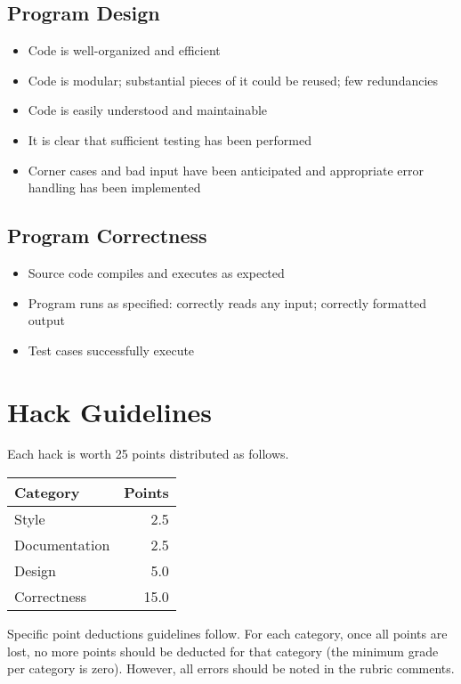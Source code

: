 \documentclass[12pt]{scrartcl}
\begin{document}
\subsection*{Program Design}
\begin{itemize}
  \item Code is well-organized and efficient
  \item Code is modular; substantial pieces of it could be reused; few redundancies
  \item Code is easily understood and maintainable
  \item It is clear that sufficient testing has been performed
  \item Corner cases and bad input have been anticipated and appropriate error handling has been implemented  
\end{itemize}

\subsection*{Program Correctness}
\begin{itemize}
  \item Source code compiles and executes as expected
  \item Program runs as specified: correctly reads any input; correctly formatted output
  \item Test cases successfully execute
\end{itemize}

\newpage

\section*{Hack Guidelines}

Each hack is worth 25 points distributed as follows.
\begin{table}[h]
\centering
\begin{tabular}{|l|r|}
\hline
Category & Points \\
\hline
Style & 2.5 \\
\hline
Documentation & 2.5 \\
\hline
Design & 5.0 \\
\hline
Correctness & 15.0 \\
\hline
\end{tabular}
\end{table}
Specific point deductions guidelines follow.  For each category, once all 
points are lost, no more points should be deducted for that category (the
minimum grade per category is zero).  However, all errors should be noted 
in the rubric comments.
\end{document}
